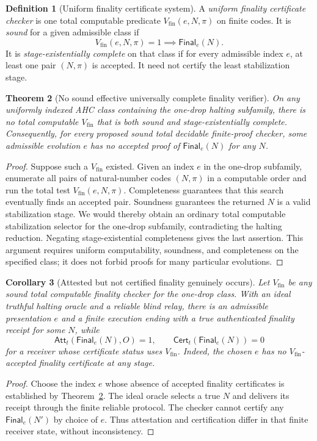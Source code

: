 \documentclass[11pt,letterpaper]{article}
\newtheorem{theorem}{Theorem}[section]
\newtheorem{corollary}[theorem]{Corollary}
\theoremstyle{definition}
\newtheorem{definition}[theorem]{Definition}
\theoremstyle{remark}
\newcommand{\Fin}{\mathsf{Final}}
\newcommand{\Cert}{\mathsf{Cert}}
\newcommand{\Att}{\mathsf{Att}}
\begin{document}
\begin{definition}[Uniform finality certificate system]
A \emph{uniform finality certificate checker} is one total computable predicate $V_{\mathrm{fin}}(e,N,\pi)$ on finite codes. It is \emph{sound} for a given admissible class if
\[
V_{\mathrm{fin}}(e,N,\pi)=1\implies\Fin_e(N).
\]
It is \emph{stage-existentially complete} on that class if for every admissible index $e$, at least one pair $(N,\pi)$ is accepted. It need not certify the least stabilization stage.
\end{definition}

\begin{theorem}[No sound effective universally complete finality verifier]
\label{thm:no-complete-fin}
On any uniformly indexed AHC class containing the one-drop halting subfamily, there is \emph{no} total computable $V_{\mathrm{fin}}$ that is both sound and stage-existentially complete. Consequently, for every proposed sound total decidable finite-proof checker, some admissible evolution $e$ has \emph{no} accepted proof of $\Fin_e(N)$ for \emph{any} $N$.
\end{theorem}
\begin{proof}
Suppose such a $V_{\mathrm{fin}}$ existed. Given an index $e$ in the one-drop subfamily, enumerate all pairs of natural-number codes $(N,\pi)$ in a computable order and run the total test $V_{\mathrm{fin}}(e,N,\pi)$. Completeness guarantees that this search eventually finds an accepted pair. Soundness guarantees the returned $N$ is a valid stabilization stage. We would thereby obtain an ordinary total computable stabilization selector for the one-drop subfamily, contradicting the halting reduction. Negating stage-existential completeness gives the last assertion. This argument requires uniform computability, soundness, and completeness on the specified class; it does not forbid proofs for many particular evolutions.
\end{proof}

\begin{corollary}[Attested but not certified finality genuinely occurs]
Let $V_{\mathrm{fin}}$ be any sound total computable finality checker for the one-drop class. With an ideal truthful halting oracle and a reliable blind relay, there is an admissible presentation $e$ and a finite execution ending with a true authenticated finality receipt for some $N$, while
\[
\Att_t(\Fin_e(N),O)=1,\qquad \Cert_t(\Fin_e(N))=0
\]
for a receiver whose certificate status uses $V_{\mathrm{fin}}$. Indeed, the chosen $e$ has no $V_{\mathrm{fin}}$-accepted finality certificate at \emph{any} stage.
\end{corollary}
\begin{proof}
Choose the index $e$ whose absence of accepted finality certificates is established by Theorem~\ref{thm:no-complete-fin}. The ideal oracle selects a true $N$ and delivers its receipt through the finite reliable protocol. The checker cannot certify any $\Fin_e(N')$ by choice of $e$. Thus attestation and certification differ in that finite receiver state, without inconsistency.
\end{proof}
\end{document}
